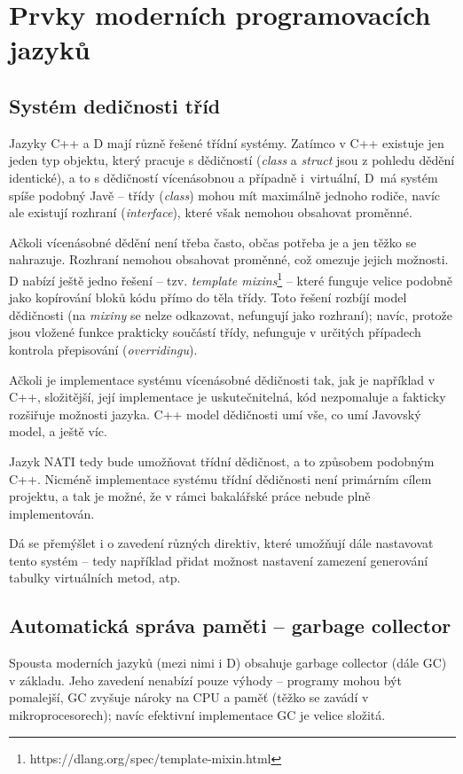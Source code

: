 \section{Prvky moderních programovacích jazyků}

\subsection{Systém dedičnosti tříd} Jazyky C++ a D mají různě řešené třídní systémy. Zatímco v C++ existuje jen jeden typ objektu, který pracuje s dědičností (\textit{class} a \textit{struct} jsou z pohledu dědění identické), a to s dědičností vícenásobnou a případně i~virtuální, D~má systém spíše podobný Javě -- třídy (\textit{class}) mohou mít maximálně jednoho rodiče, navíc ale existují rozhraní (\textit{interface}), které však nemohou obsahovat proměnné.

Ačkoli vícenásobné dědění není třeba často, občas potřeba je a jen těžko se nahrazuje. Rozhraní nemohou obsahovat proměnné, což omezuje jejich možnosti. D nabízí ještě jedno řešení -- tzv. \textit{template mixins}\footnote{https://dlang.org/spec/template-mixin.html} -- které funguje velice podobně jako kopírování bloků kódu přímo do těla třídy. Toto řešení rozbíjí model dědičnosti (na \textit{mixiny} se nelze odkazovat, nefungují jako rozhraní); navíc, protože jsou vložené funkce prakticky součástí třídy, nefunguje v určitých případech kontrola přepisování (\textit{overridingu}).

Ačkoli je implementace systému vícenásobné dědičnosti tak, jak je například v C++, složitější, její implementace je uskutečnitelná, kód nezpomaluje a fakticky rozšiřuje možnosti jazyka. C++ model dědičnosti umí vše, co umí Javovský model, a ještě víc.

Jazyk NATI tedy bude umožňovat třídní dědičnost, a to způsobem podobným C++. Nicméně implementace systému třídní dědičnosti není primárním cílem projektu, a tak je možné, že v rámci bakalářské práce nebude plně implementován.

Dá se přemýšlet i o zavedení různých direktiv, které umožňují dále nastavovat tento systém -- tedy například přidat možnost nastavení zamezení generování tabulky virtuálních metod, atp.

\subsection{Automatická správa paměti -- garbage collector}
Spousta moderních jazyků (mezi nimi i D) obsahuje garbage collector (dále GC) v základu. Jeho zavedení nenabízí pouze výhody -- programy mohou být pomalejší, GC zvyšuje nároky na CPU a paměť (těžko se zavádí v mikroprocesorech); navíc efektivní implementace GC je velice složitá.

